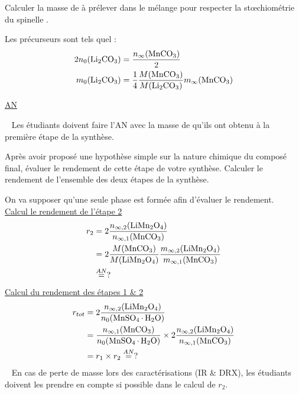\documentclass[twoside,a4paper,11pt,addpoints,answers]{exam}%
\newcounter{foo} %
\begin{document}
\begin{questions}
\setcounter{question}{\thefoo}

\question[1] \label{Q:2-01} {\color{purple} Calculer la masse de  à prélever dans le mélange pour respecter la st{\oe}chiométrie du spinelle .}

\begin{mybox}\begin{solution}[4cm]
Les précurseurs sont tels quel : 
\begin{align*}
2 n_0 ( \ce{Li2CO3 } ) &=  \frac{n_\infty ( \ce{MnCO3} )}{2} \\
m_0 ( \ce{Li2CO3} ) &=  \frac{1}{4} \frac{M ( \ce{MnCO3} )}{M ( \ce{Li2CO3} ) } m_\infty ( \ce{MnCO3} )
\end{align*}

\underline{AN}


\faWarning ~ Les étudiants doivent faire l'AN avec la masse de  qu'ils ont obtenu à la première étape de la synthèse.

\end{solution}\end{mybox}


\question[1] \label{Q:2-02} Après avoir proposé une hypothèse simple sur la nature chimique du composé final, évaluer le rendement de cette étape de votre synthèse. Calculer le rendement de l'ensemble des deux étapes de la synthèse.

\begin{mybox}\begin{solution}[7cm]
On va supposer qu'une seule phase est formée afin d'évaluer le rendement. \\
\underline{Calcul le rendement de l'étape 2}
\begin{align*}
r_2 &= 2 \frac{n_{\infty,2} ( \ce{LiMn2O4} )}{n_{\infty,1} ( \ce{MnCO3}) } \\
&= 2 \frac{M ( \ce{MnCO3})}{M ( \ce{LiMn2O4} )} \frac{m_{\infty,2} ( \ce{LiMn2O4} )}{m_{\infty,1} ( \ce{MnCO3}) }\\
&\stackrel{AN}{=} ?
\end{align*}
\underline{Calcul du rendement des étapes 1 \& 2}
\begin{align*}
r_{tot} &= 2 \frac{n_{\infty, 2} ( \ce{LiMn2O4} ) }{n_{0} ( \ce{MnSO4 . H2O} ) } \\ 
&= \frac{n_{\infty,1} ( \ce{MnCO3})}{n_{0} ( \ce{MnSO4 . H2O} ) } \times 2 \frac{n_{\infty,2} ( \ce{LiMn2O4} )}{n_{\infty,1} ( \ce{MnCO3}) } \\
&= r_1 \times r_2 \stackrel{AN}{=} ?
\end{align*}
\faWarning ~ En cas de perte de masse lors des caractérisations (IR \& DRX), les étudiants doivent les prendre en compte si possible dans le calcul de $r_2$.
\end{solution}\end{mybox}


\end{questions}
\end{document}
